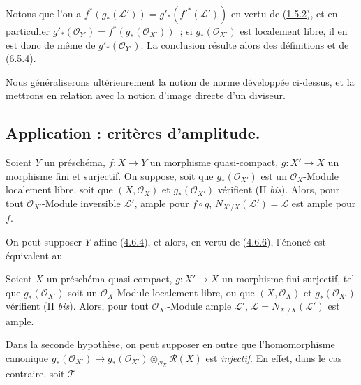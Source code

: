 Notons que l'on a $f^*(g_*(\mathcal{L}'))=g'_*({f'}^*(\mathcal{L}'))$ en
vertu de (\hyperref[II.1.5.2-fr]{1.5.2}), et en particulier
$g'_*(\mathcal{O}_{Y'})=f^*(g_*(\mathcal{O}_{X'}))$~; si
$g_*(\mathcal{O}_{X'})$ est localement libre, il en est donc de même de
$g'_*(\mathcal{O}_{Y'})$. La conclusion résulte alors des définitions et de
(\hyperref[II.6.5.4-fr]{6.5.4}).

\begin{remark}[6.5.9]
\label{II.6.5.9-fr}
Nous généraliserons ultérieurement la notion de norme développée ci-dessus,
et la mettrons en relation avec la notion d'image directe d'un diviseur.
\end{remark}

\subsection{Application : critères d'amplitude.}
\label{subsection:II.6.6-fr}

\begin{proposition}[6.6.1]
\label{II.6.6.1-fr}
Soient $Y$ un préschéma, $f:X\to Y$ un morphisme quasi-compact,
$g:X'\to X$ un morphisme fini et surjectif. On suppose, soit que
$g_*(\mathcal{O}_{X'})$ est un $\mathcal{O}_X$-Module localement libre, soit
que $(X,\mathcal{O}_X)$ et $g_*(\mathcal{O}_{X'})$ vérifient (II
\emph{bis}). Alors, pour tout $\mathcal{O}_{X'}$-Module inversible
$\mathcal{L}'$, ample pour $f\circ g$, $N_{X'/X}(\mathcal{L}')=\mathcal{L}$
est ample pour $f$.
\end{proposition}

On peut supposer $Y$ affine (\hyperref[II.4.6.4-fr]{4.6.4}), et alors, en
vertu de (\hyperref[II.4.6.6-fr]{4.6.6}), l'énoncé est équivalent au

\begin{corollary}[6.6.2]
\label{II.6.6.2-fr}
Soient $X$ un préschéma quasi-compact, $g:X'\to X$ un morphisme fini
surjectif, tel que $g_*(\mathcal{O}_{X'})$ soit un $\mathcal{O}_X$-Module
localement libre, ou que $(X,\mathcal{O}_X)$ et $g_*(\mathcal{O}_{X'})$
vérifient (II \emph{bis}). Alors, pour tout $\mathcal{O}_{X'}$-Module ample
$\mathcal{L}'$, $\mathcal{L}=N_{X'/X}(\mathcal{L}')$ est ample.
\end{corollary}

Dans la seconde hypothèse, on peut supposer en outre que l'homomorphisme
canonique
$g_*(\mathcal{O}_{X'})\to
g_*(\mathcal{O}_{X'})\otimes_{\mathcal{O}_X}\mathcal{R}(X)$ est
\emph{injectif}. En effet, dans le cas contraire, soit $\mathcal{T}$

